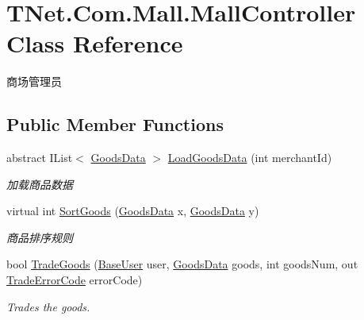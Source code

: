 \hypertarget{class_t_net_1_1_com_1_1_mall_1_1_mall_controller}{}\section{T\+Net.\+Com.\+Mall.\+Mall\+Controller Class Reference}
\label{class_t_net_1_1_com_1_1_mall_1_1_mall_controller}


商场管理员  


\subsection*{Public Member Functions}
\begin{DoxyCompactItemize}
\item 
abstract I\+List$<$ \mbox{\hyperlink{class_t_net_1_1_com_1_1_model_1_1_goods_data}{Goods\+Data}} $>$ \mbox{\hyperlink{class_t_net_1_1_com_1_1_mall_1_1_mall_controller_a0eb2b857ce9b0a9257c1562d98c2bbb1}{Load\+Goods\+Data}} (int merchant\+Id)
\begin{DoxyCompactList}\small\item\em 加载商品数据 \end{DoxyCompactList}\item 
virtual int \mbox{\hyperlink{class_t_net_1_1_com_1_1_mall_1_1_mall_controller_a9f8a3ef5e8a2596e49346c9393e5bed8}{Sort\+Goods}} (\mbox{\hyperlink{class_t_net_1_1_com_1_1_model_1_1_goods_data}{Goods\+Data}} x, \mbox{\hyperlink{class_t_net_1_1_com_1_1_model_1_1_goods_data}{Goods\+Data}} y)
\begin{DoxyCompactList}\small\item\em 商品排序规则 \end{DoxyCompactList}\item 
bool \mbox{\hyperlink{class_t_net_1_1_com_1_1_mall_1_1_mall_controller_aa9318fbb45e817b88ccbaaf88c2c9ab0}{Trade\+Goods}} (\mbox{\hyperlink{class_t_net_1_1_context___1_1_base_user}{Base\+User}} user, \mbox{\hyperlink{class_t_net_1_1_com_1_1_model_1_1_goods_data}{Goods\+Data}} goods, int goods\+Num, out \mbox{\hyperlink{namespace_t_net_1_1_com_1_1_mall_a8ed58f71da1d1495830104612fc5667a}{Trade\+Error\+Code}} error\+Code)
\begin{DoxyCompactList}\small\item\em Trades the goods. \end{DoxyCompactList}\end{DoxyCompactItemize}
